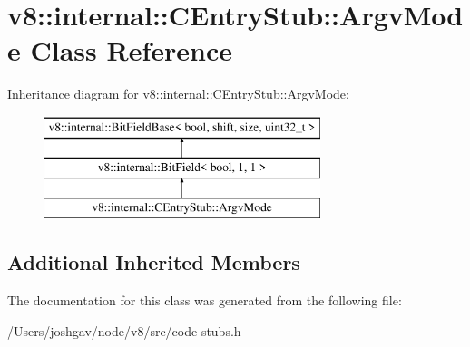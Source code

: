 \hypertarget{classv8_1_1internal_1_1_c_entry_stub_1_1_argv_mode}{}\section{v8\+:\+:internal\+:\+:C\+Entry\+Stub\+:\+:Argv\+Mode Class Reference}
\label{classv8_1_1internal_1_1_c_entry_stub_1_1_argv_mode}
Inheritance diagram for v8\+:\+:internal\+:\+:C\+Entry\+Stub\+:\+:Argv\+Mode\+:\begin{figure}[H]
\begin{center}
\leavevmode
\includegraphics[height=3.000000cm]{classv8_1_1internal_1_1_c_entry_stub_1_1_argv_mode}
\end{center}
\end{figure}
\subsection*{Additional Inherited Members}


The documentation for this class was generated from the following file\+:\begin{DoxyCompactItemize}
\item 
/\+Users/joshgav/node/v8/src/code-\/stubs.\+h\end{DoxyCompactItemize}
